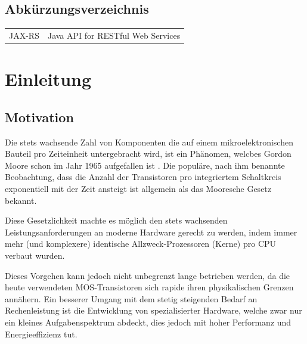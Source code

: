 \documentclass[a4paper,12pt,onesided]{report}
\begin{document}
{
  \setlength{\cftbeforechapskip}{-.5ex}
  \tableofcontents
}

\newpage
\listoffigures
{}

\newpage
\listoftables
{}

\newpage
\lstlistoflistings
{}

\newpage
\section*{Abkürzungsverzeichnis}
\begin{tabular}{ll}
  JAX-RS&Java API for RESTful Web Services\\
\end{tabular}

\newpage
\chapter{Einleitung}

\section{Motivation}
Die stets wachsende Zahl von Komponenten die auf einem mikroelektronischen Bauteil pro Zeiteinheit untergebracht wird, ist ein Phänomen, welcbes Gordon Moore schon im Jahr 1965 aufgefallen ist \cite{moore1965cramming}. Die populäre, nach ihm benannte Beobachtung, dass die Anzahl der Transistoren pro integriertem Schaltkreis exponentiell mit der Zeit ansteigt ist allgemein als das Mooresche Gesetz bekannt.

Diese Gesetzlichkeit machte es möglich den stets wachsenden Leistungsanforderungen an moderne Hardware gerecht zu werden, indem immer mehr (und komplexere) identische Allzweck-Prozessoren (Kerne) pro CPU verbaut wurden.

Dieses Vorgehen kann jedoch nicht unbegrenzt lange betrieben werden, da die heute verwendeten MOS-Transistoren sich rapide ihren physikalischen Grenzen annähern. Ein besserer Umgang mit dem stetig steigenden Bedarf an Rechenleistung ist die Entwicklung von spezialisierter Hardware, welche zwar nur ein kleines Aufgabenspektrum abdeckt, dies jedoch mit hoher Performanz und Energieeffizienz tut.
\end{document}
